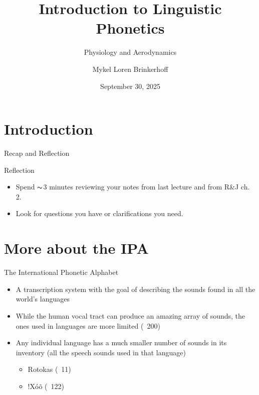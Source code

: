 \documentclass[professionalfonts]{beamer}
\title[LING 450/550] %
{Introduction to Linguistic Phonetics}
\subtitle{Physiology and Aerodynamics}
\author[Brinkerhoff] %
{Mykel Loren Brinkerhoff}
\institute[UW] %
{University of Washington}
\date[2025-09-30] %
{September 30, 2025}
\begin{document}
\begin{frame}
    \titlepage
\end{frame}

\section{Introduction}

\begin{frame}{Recap and Reflection}
    \begin{block}{Reflection}
        \begin{itemize}
            \item Spend $\thicksim$3 minutes reviewing your notes from last lecture and from R\&J ch. 2.
            \item Look for questions you have or clarifications you need. 
        \end{itemize}
    \end{block}
\end{frame}

\section{More about the IPA}

\begin{frame}{The International Phonetic Alphabet}
    \begin{itemize}
        \item A transcription system with the goal of describing the sounds found in all the world’s languages

        \item While the human vocal tract can produce an amazing array of sounds, the ones used in languages are more limited (~200)

        \item Any individual language has a much smaller number of sounds in its inventory (all the speech sounds used in that language)
        \begin{itemize}
            \item Rotokas (~11)
            \item !Xóõ (~122)
        \end{itemize}
    \end{itemize}
\end{frame}
\end{document}
